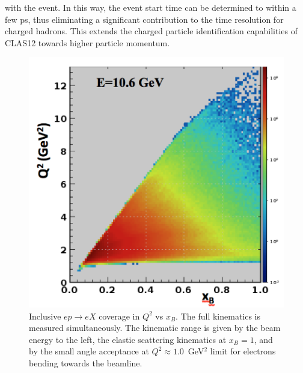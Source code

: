 \documentclass[final,3p,times,twocolumn,authoryear]{elsarticle}
\begin{document}
with the event. In this way, the event start time can be determined to within a few ps, thus eliminating a significant contribution to the time resolution for charged hadrons. This extends the charged particle identification capabilities of 
CLAS12 towards higher particle momentum.
\begin{figure}[htbp!]
\centerline{\includegraphics[width=1.0\columnwidth]{e-inclusive.png}}
\caption{Inclusive $ep \to eX$ coverage in $Q^2$ vs $x_B$.  
The full kinematics is measured simultaneously. 
The kinematic range is given by the beam energy to the left, the elastic scattering kinematics at $x_B = 1$, and by the small angle acceptance at $Q^2 \approx 1.0$~GeV$^2$ limit for electrons bending towards the beamline. } 
\label{electron-acceptance}
\end{figure}
\end{document}

